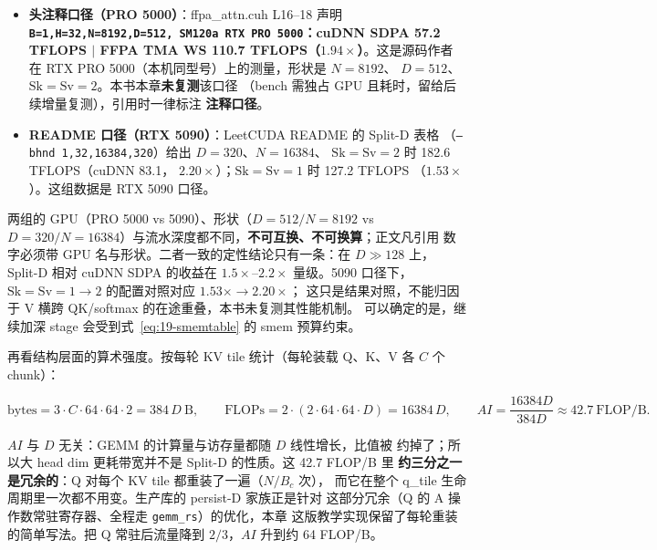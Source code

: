 \begin{itemize}[itemsep=2pt,topsep=2pt]
  \item \textbf{头注释口径（PRO 5000）}：ffpa\_attn.cuh L16--18 声明
        \textbf{\texttt{B=\allowbreak{}1,\allowbreak{}H=\allowbreak{}32,\allowbreak{}N=\allowbreak{}8192,\allowbreak{}D=\allowbreak{}512,\allowbreak{} SM120a RTX PRO 5000}：cuDNN SDPA
        57.2 TFLOPS $|$ FFPA TMA WS 110.7 TFLOPS（$1.94\times$）}。这是源码作者
        在 RTX PRO 5000（本机同型号）上的测量，形状是 $N{=}8192$、
        $D{=}512$、$\mathrm{Sk}=\mathrm{Sv}=2$。本书本章\textbf{未复测}该口径
        （bench 需独占 GPU 且耗时，留给后续增量复测），引用时一律标注
        \textbf{注释口径}。
  \item \textbf{README 口径（RTX 5090）}：LeetCUDA README 的 Split-D 表格
        （\texttt{--bhnd 1,\allowbreak{}32,\allowbreak{}16384,\allowbreak{}320}）给出 $D{=}320$、$N{=}16384$、
        $\mathrm{Sk}=\mathrm{Sv}=2$ 时 182.6 TFLOPS（cuDNN 83.1，
        $2.20\times$）；$\mathrm{Sk}=\mathrm{Sv}=1$ 时 127.2 TFLOPS
        （$1.53\times$）。这组数据是 RTX 5090 口径。
\end{itemize}

两组的 GPU（PRO 5000 vs 5090）、形状（$D{=}512/N{=}8192$ vs
$D{=}320/N{=}16384$）与流水深度都不同，\textbf{不可互换、不可换算}；正文凡引用
数字必须带 GPU 名与形状。二者一致的定性结论只有一条：在 $D \gg 128$ 上，
Split-D 相对 cuDNN SDPA 的收益在 $1.5\times$--$2.2\times$ 量级。5090 口径下，
$\mathrm{Sk}{=}\mathrm{Sv}{=}1\to2$ 的配置对照对应 $1.53\times \to 2.20\times$；
这只是结果对照，不能归因于 V 横跨 QK/softmax 的在途重叠，本书未复测其性能机制。
可以确定的是，继续加深 stage 会受到式~\ref{eq:19-smemtable} 的 smem 预算约束。

再看结构层面的算术强度。按每轮 KV tile 统计（每轮装载 Q、K、V 各 $C$ 个 chunk）：

\begin{equation}
  \mathrm{bytes} = 3 \cdot C \cdot 64 \cdot 64 \cdot 2 = 384\,D\ \text{B} ,
  \qquad
  \mathrm{FLOPs} = 2\cdot(2 \cdot 64 \cdot 64 \cdot D) = 16384\,D ,
  \qquad
  AI = \frac{16384D}{384D} \approx 42.7\ \text{FLOP/B} .
  \label{eq:19-ai}
\end{equation}

$AI$ 与 $D$ 无关：GEMM 的计算量与访存量都随 $D$ 线性增长，比值被
约掉了；所以大 head dim 更耗带宽并不是 Split-D 的性质。这 42.7 FLOP/B 里
\textbf{约三分之一是冗余的}：Q 对每个 KV tile 都重装了一遍（$N/B_c$ 次），
而它在整个 q\_tile 生命周期里一次都不用变。生产库的 persist-D 家族正是针对
这部分冗余（Q 的 A 操作数常驻寄存器、全程走 \texttt{gemm\_rs}）的优化，本章
这版教学实现保留了每轮重装的简单写法。把 Q 常驻后流量降到 $2/3$，$AI$ 升到约
64 FLOP/B。


